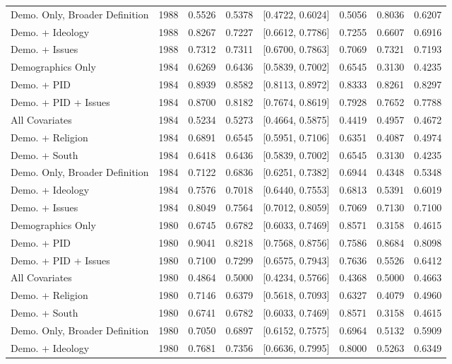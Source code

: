 \begin{longtable}{lrrrlrrr}
  Demo. Only, Broader Definition & 1988 & 0.5526 & 0.5378 & [0.4722, 0.6024] & 0.5056 & 0.8036 & 0.6207 \\ 
  Demo. + Ideology & 1988 & 0.8267 & 0.7227 & [0.6612, 0.7786] & 0.7255 & 0.6607 & 0.6916 \\ 
  Demo. + Issues & 1988 & 0.7312 & 0.7311 & [0.6700, 0.7863] & 0.7069 & 0.7321 & 0.7193 \\ 
  Demographics Only & 1984 & 0.6269 & 0.6436 & [0.5839, 0.7002] & 0.6545 & 0.3130 & 0.4235 \\ 
  Demo. + PID & 1984 & 0.8939 & 0.8582 & [0.8113, 0.8972] & 0.8333 & 0.8261 & 0.8297 \\ 
  Demo. + PID + Issues & 1984 & 0.8700 & 0.8182 & [0.7674, 0.8619] & 0.7928 & 0.7652 & 0.7788 \\ 
  All Covariates & 1984 & 0.5234 & 0.5273 & [0.4664, 0.5875] & 0.4419 & 0.4957 & 0.4672 \\ 
  Demo. + Religion & 1984 & 0.6891 & 0.6545 & [0.5951, 0.7106] & 0.6351 & 0.4087 & 0.4974 \\ 
  Demo. + South & 1984 & 0.6418 & 0.6436 & [0.5839, 0.7002] & 0.6545 & 0.3130 & 0.4235 \\ 
  Demo. Only, Broader Definition & 1984 & 0.7122 & 0.6836 & [0.6251, 0.7382] & 0.6944 & 0.4348 & 0.5348 \\ 
  Demo. + Ideology & 1984 & 0.7576 & 0.7018 & [0.6440, 0.7553] & 0.6813 & 0.5391 & 0.6019 \\ 
  Demo. + Issues & 1984 & 0.8049 & 0.7564 & [0.7012, 0.8059] & 0.7069 & 0.7130 & 0.7100 \\ 
  Demographics Only & 1980 & 0.6745 & 0.6782 & [0.6033, 0.7469] & 0.8571 & 0.3158 & 0.4615 \\ 
  Demo. + PID & 1980 & 0.9041 & 0.8218 & [0.7568, 0.8756] & 0.7586 & 0.8684 & 0.8098 \\ 
  Demo. + PID + Issues & 1980 & 0.7100 & 0.7299 & [0.6575, 0.7943] & 0.7636 & 0.5526 & 0.6412 \\ 
  All Covariates & 1980 & 0.4864 & 0.5000 & [0.4234, 0.5766] & 0.4368 & 0.5000 & 0.4663 \\ 
  Demo. + Religion & 1980 & 0.7146 & 0.6379 & [0.5618, 0.7093] & 0.6327 & 0.4079 & 0.4960 \\ 
  Demo. + South & 1980 & 0.6741 & 0.6782 & [0.6033, 0.7469] & 0.8571 & 0.3158 & 0.4615 \\ 
  Demo. Only, Broader Definition & 1980 & 0.7050 & 0.6897 & [0.6152, 0.7575] & 0.6964 & 0.5132 & 0.5909 \\ 
  Demo. + Ideology & 1980 & 0.7681 & 0.7356 & [0.6636, 0.7995] & 0.8000 & 0.5263 & 0.6349 \\ 

\end{longtable}
